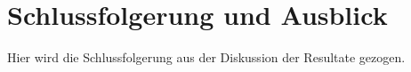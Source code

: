 %
%
%
%

\chapter{Schlussfolgerung und Ausblick}
\label{chap:Schlussfolgerung}


Hier wird die Schlussfolgerung aus der Diskussion der Resultate gezogen. 

%

